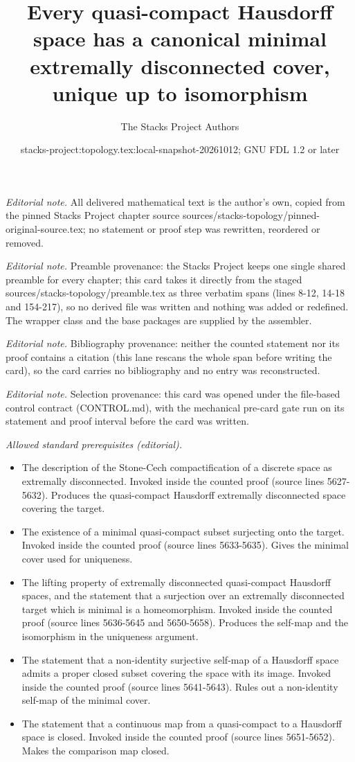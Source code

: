 \documentclass[10pt,a4paper]{amsart}
\title{Every quasi-compact Hausdorff space has a canonical minimal extremally disconnected cover, unique up to isomorphism}
\author{The Stacks Project Authors}
\date{stacks-project:topology.tex:local-snapshot-20261012; GNU FDL 1.2 or later}
\theoremstyle{plain}
\theoremstyle{definition}
\theoremstyle{remark}
\numberwithin{equation}{subsection}
\begin{document}
\maketitle
\noindent\textit{Editorial note.} All delivered mathematical text is the author's own, copied from the pinned Stacks Project chapter source sources/stacks-topology/pinned-original-source.tex; no statement or proof step was rewritten, reordered or removed.\par\medskip
\noindent\textit{Editorial note.} Preamble provenance: the Stacks Project keeps one single shared preamble for every chapter; this card takes it directly from the staged sources/stacks-topology/preamble.tex as three verbatim spans (lines 8-12, 14-18 and 154-217), so no derived file was written and nothing was added or redefined. The wrapper class and the base packages are supplied by the assembler.\par\medskip
\noindent\textit{Editorial note.} Bibliography provenance: neither the counted statement nor its proof contains a citation (this lane rescans the whole span before writing the card), so the card carries no bibliography and no entry was reconstructed.\par\medskip
\noindent\textit{Editorial note.} Selection provenance: this card was opened under the file-based control contract (CONTROL.md), with the mechanical pre-card gate run on its statement and proof interval before the card was written.\par\medskip
\noindent\textit{Allowed standard prerequisites (editorial).}\begin{itemize}
\item The description of the Stone-Cech compactification of a discrete space as extremally disconnected. Invoked inside the counted proof (source lines 5627-5632). Produces the quasi-compact Hausdorff extremally disconnected space covering the target.
\item The existence of a minimal quasi-compact subset surjecting onto the target. Invoked inside the counted proof (source lines 5633-5635). Gives the minimal cover used for uniqueness.
\item The lifting property of extremally disconnected quasi-compact Hausdorff spaces, and the statement that a surjection over an extremally disconnected target which is minimal is a homeomorphism. Invoked inside the counted proof (source lines 5636-5645 and 5650-5658). Produces the self-map and the isomorphism in the uniqueness argument.
\item The statement that a non-identity surjective self-map of a Hausdorff space admits a proper closed subset covering the space with its image. Invoked inside the counted proof (source lines 5641-5643). Rules out a non-identity self-map of the minimal cover.
\item The statement that a continuous map from a quasi-compact to a Hausdorff space is closed. Invoked inside the counted proof (source lines 5651-5652). Makes the comparison map closed.
\end{itemize}\medskip
\end{document}
